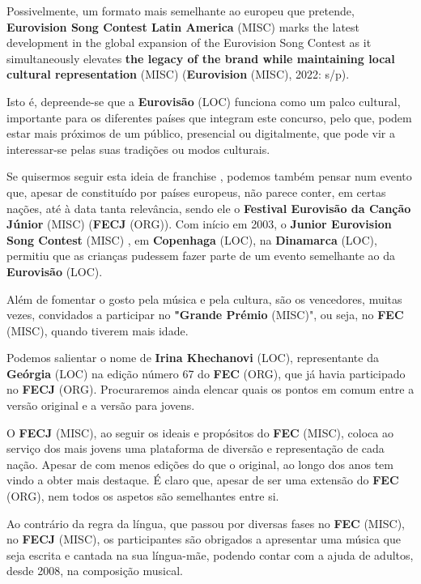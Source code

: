 \documentclass[12pt,a4paper]{article}
\begin{document}
Possivelmente, um formato mais semelhante ao europeu que pretende, \textbf{Eurovision  Song  Contest  Latin  America} (MISC)  marks  the  latest  development  in  the  global expansion of the Eurovision Song Contest as it simultaneously elevates \textbf{the legacy of the brand while maintaining local cultural representation} (MISC) (\textbf{Eurovision} (MISC), 2022: s/p).

Isto é, depreende-se que a \textbf{Eurovisão} (LOC) funciona como um palco cultural, importante para  os  diferentes  países  que  integram  este  concurso,  pelo  que,  podem  estar  mais próximos de um público, presencial ou digitalmente, que pode vir a interessar-se pelas suas tradições ou modos culturais.

Se quisermos seguir esta ideia de franchise , podemos também pensar num evento que, apesar de constituído por países europeus, não parece conter, em certas nações, até à data tanta relevância, sendo ele o \textbf{Festival Eurovisão da Canção Júnior} (MISC) (\textbf{FECJ} (ORG)). Com início  em  2003,  o \textbf{Junior  Eurovision  Song  Contest} (MISC) ,  em  \textbf{Copenhaga} (LOC),  na  \textbf{Dinamarca} (LOC), permitiu que as crianças pudessem fazer parte de um evento semelhante ao da \textbf{Eurovisão} (LOC).

Além de fomentar o gosto pela música e pela cultura, são os vencedores, muitas vezes, convidados a participar no \textbf{"Grande Prémio} (MISC)", ou seja, no \textbf{FEC} (MISC), quando tiverem mais idade.

Podemos  salientar  o  nome  de  \textbf{Irina  Khechanovi} (LOC),  representante  da  \textbf{Geórgia} (LOC)  na  edição número 67 do \textbf{FEC} (ORG), que já havia participado no \textbf{FECJ} (ORG). Procuraremos ainda elencar quais os pontos em comum entre a versão original e a versão para jovens.

O  \textbf{FECJ} (MISC),  ao  seguir  os  ideais  e  propósitos  do  \textbf{FEC} (MISC),  coloca  ao  serviço  dos  mais jovens uma plataforma de diversão e representação de cada nação. Apesar de com menos edições do que o original, ao longo dos anos tem vindo a obter mais destaque. É claro que, apesar de ser uma extensão do \textbf{FEC} (ORG), nem todos os aspetos são semelhantes entre si.

Ao  contrário  da  regra  da  língua,  que  passou  por  diversas  fases  no  \textbf{FEC} (MISC),  no  \textbf{FECJ} (MISC),  os participantes  são  obrigados  a  apresentar  uma  música  que  seja  escrita  e  cantada  na  sua língua-mãe, podendo contar com a ajuda de adultos, desde 2008, na composição musical.
\end{document}
